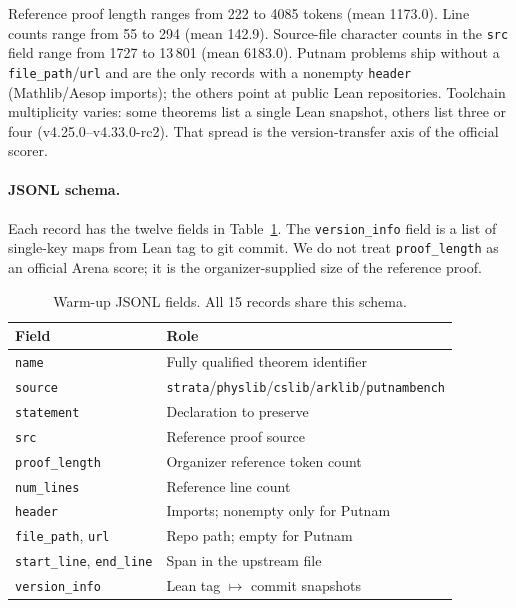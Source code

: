 \documentclass{article}
\begin{document}
Reference proof length ranges from 222 to 4085 tokens (mean 1173.0). Line counts range from 55 to 294 (mean 142.9). Source-file character counts in the \texttt{src} field range from 1727 to 13\,801 (mean 6183.0). Putnam problems ship without a \texttt{file\_path}/\texttt{url} and are the only records with a nonempty \texttt{header} (Mathlib/Aesop imports); the others point at public Lean repositories. Toolchain multiplicity varies: some theorems list a single Lean snapshot, others list three or four (v4.25.0--v4.33.0-rc2). That spread is the version-transfer axis of the official scorer.

\paragraph{JSONL schema.} Each record has the twelve fields in Table~\ref{schema-table}. The \texttt{version\_info} field is a list of single-key maps from Lean tag to git commit. We do not treat \texttt{proof\_length} as an official Arena score; it is the organizer-supplied size of the reference proof.

\begin{table}[ht]
  \caption{Warm-up JSONL fields. All 15 records share this schema.}
  \label{schema-table}
  \centering
  \small
  \begin{tabular}{ll}
    \toprule
    Field & Role \\
    \midrule
    \texttt{name} & Fully qualified theorem identifier \\
    \texttt{source} & \texttt{strata}/\texttt{physlib}/\texttt{cslib}/\texttt{arklib}/\texttt{putnambench} \\
    \texttt{statement} & Declaration to preserve \\
    \texttt{src} & Reference proof source \\
    \texttt{proof\_length} & Organizer reference token count \\
    \texttt{num\_lines} & Reference line count \\
    \texttt{header} & Imports; nonempty only for Putnam \\
    \texttt{file\_path}, \texttt{url} & Repo path; empty for Putnam \\
    \texttt{start\_line}, \texttt{end\_line} & Span in the upstream file \\
    \texttt{version\_info} & Lean tag $\mapsto$ commit snapshots \\
    \bottomrule
  \end{tabular}
\end{table}
\end{document}
